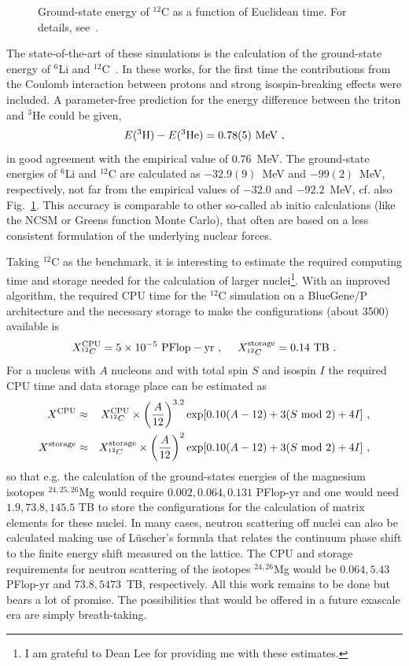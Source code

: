 \documentclass[a4paper,fleqn]{scrartcl}
\newcommand{\beq}{\begin{equation}}
\newcommand{\eeq}{\end{equation}}
\newcommand{\beqa}{\begin{eqnarray}}
\newcommand{\eeqa}{\end{eqnarray}}
\begin{document}
{\begin{figure}[t]
\begin{center}
\caption[timesteps]{\label{fig:c12} Ground-state energy of  $^{12}$C as a
function of  Euclidean time. For details, see~\cite{Epelbaum:2009pd}.}
\end{center}
\vspace{-5mm}
\end{figure}
The state-of-the-art of these simulations is the calculation of the 
ground-state energy of  $^6$Li and $^{12}$C~\cite{Epelbaum:2009pd}. 
In these works, for the first time the contributions from the Coulomb
interaction between protons and strong isospin-breaking effects were
included. A parameter-free prediction for the energy difference between
the triton and $^3$He could be given,
\begin{equation}
E(^3{\rm H}) - E(^3{\rm He}) = 0.78(5)~{\rm MeV}~,
\end{equation}
in good agreement with the empirical value of  $0.76$~MeV.
The ground-state energies of  $^6$Li and $^{12}$C are calculated
as  $-32.9(9)$~MeV and $-99(2)$~MeV, respectively, not far from
the empirical values of  $-32.0$ and $-92.2$~MeV, cf. also Fig.~\ref{fig:c12}.
This accuracy is comparable to other so-called ab initio calculations
(like the NCSM or Greens function Monte Carlo), that often are based
on a less consistent formulation of the underlying nuclear forces.

Taking  $^{12}$C as the benchmark, it is interesting to estimate the required
computing time and storage needed for the calculation of larger 
nuclei\footnote{I am grateful to Dean Lee for providing me with these estimates.}.
With an improved algorithm, the required CPU time for the  $^{12}$C
simulation on a BlueGene/P architecture and the necessary storage to make
the configurations (about 3500) available is
\beq
X_{^{12}C}^{\rm CPU} = 5 \times 10^{-5}~{\rm PFlop-yr}~,~~~~
X_{^{12}C}^{\rm storage} = 0.14~{\rm TB}~.
\eeq
For a nucleus with $A$ nucleons and with total spin $S$ and isospin $I$
the required CPU time and data storage place can be estimated as
\beqa
X^{\rm CPU} &\approx& X_{^{12}C}^{\rm CPU} \times \left(
  \frac{A}{12}\right)^{3.2}\exp[0.10(A-12) + 3(S~{\rm mod}~2) +4I]~,
\nonumber \\
X^{\rm storage} &\approx& X_{^{12}C}^{\rm storage} \times \left(
  \frac{A}{12}\right)^{2}\exp[0.10(A-12) + 3(S~{\rm mod}~2) +4I]~,
\eeqa
so that e.g. the calculation of the ground-states energies of the magnesium 
isotopes $^{24,25,26}$Mg would require $0.002, 0.064, 0.131$ PFlop-yr and
one would need $1.9, 73.8, 145.5$ TB to store the configurations for the calculation of
matrix elements for these nuclei. In many cases, neutron scattering off nuclei
can also be calculated making use of L\"uscher's formula that relates the
continuum phase shift to the finite energy shift measured on the lattice.
The CPU and storage requirements for neutron scattering of the isotopes $^{24,26}$Mg 
would be  $0.064, 5.43$ PFlop-yr and  $73.8,  5473$~TB, respectively. 
All this work remains to be done but bears a lot of promise. The possibilities 
that would be offered in a future exascale era are
simply breath-taking. 

}
\end{document}
